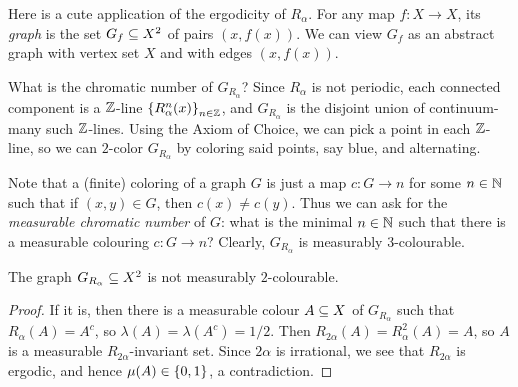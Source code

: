 \documentclass[reqno, twoside]{article}
\begin{document}
    Here is a cute application of the ergodicity of $R_\alpha$. For any map $f:X\to X$, its \textit{graph} is the set $G_f\subseteq X^2$ of pairs $(x,f(x))$. We can view $G_f$ as an abstract graph with vertex set $X$ and with edges $(x,f(x))$.

    What is the chromatic number of $G_{R_\alpha}$? Since $R_\alpha$ is not periodic, each connected component is a $\mathbb{Z}$-line $\left\{R_\alpha^n(x)\right\}_{n\in\mathbb{Z}}$, and $G_{R_\alpha}$ is the disjoint union of continuum-many such $\mathbb{Z}$-lines. Using the Axiom of Choice, we can pick a point in each $\mathbb{Z}$-line, so we can $2$-color $G_{R_\alpha}$ by coloring said points, say blue, and alternating.

    Note that a (finite) coloring of a graph $G$ is just a map $c:G\to n$ for some $n\in\mathbb{N}$ such that if $(x,y)\in G$, then $c(x)\neq c(y)$. Thus we can ask for the \textit{measurable chromatic number} of $G$: what is the minimal $n\in\mathbb{N}$ such that there is a measurable colouring $c:G\to n$? Clearly, $G_{R_\alpha}$ is measurably $3$-colourable.

    \begin{corollary}
        The graph $G_{R_\alpha}\subseteq X^2$ is not measurably $2$-colourable.
    \end{corollary}
    \begin{proof}
        If it is, then there is a measurable colour $A\subseteq X$ of $G_{R_\alpha}$ such that $R_\alpha(A)=A^c$, so $\lambda(A)=\lambda(A^c)=1/2$. Then $R_{2\alpha}(A)=R_\alpha^2(A)=A$, so $A$ is a measurable $R_{2\alpha}$-invariant set. Since $2\alpha$ is irrational, we see that $R_{2\alpha}$ is ergodic, and hence $\mu(A)\in\left\{0,1\right\}$, a contradiction.
    \end{proof}
\end{document}
